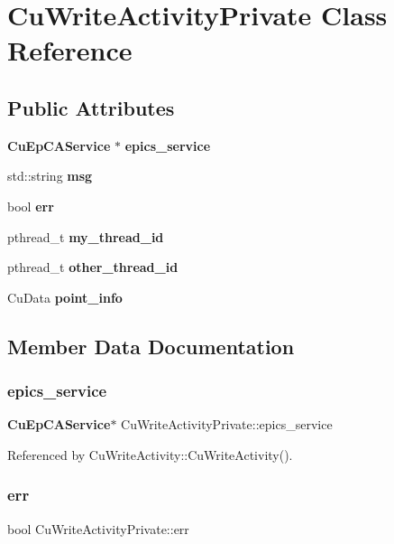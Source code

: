 \section{Cu\+Write\+Activity\+Private Class Reference}
\label{classCuWriteActivityPrivate}
\subsection*{Public Attributes}
\begin{DoxyCompactItemize}
\item 
\textbf{ Cu\+Ep\+C\+A\+Service} $\ast$ \textbf{ epics\+\_\+service}
\item 
std\+::string \textbf{ msg}
\item 
bool \textbf{ err}
\item 
pthread\+\_\+t \textbf{ my\+\_\+thread\+\_\+id}
\item 
pthread\+\_\+t \textbf{ other\+\_\+thread\+\_\+id}
\item 
Cu\+Data \textbf{ point\+\_\+info}
\end{DoxyCompactItemize}


\subsection{Member Data Documentation}
\mbox{\label{classCuWriteActivityPrivate_a53c62a50cd5c4bbae6ad887d01846831}} 
\subsubsection{epics\+\_\+service}
{\footnotesize\ttfamily \textbf{ Cu\+Ep\+C\+A\+Service}$\ast$ Cu\+Write\+Activity\+Private\+::epics\+\_\+service}



Referenced by Cu\+Write\+Activity\+::\+Cu\+Write\+Activity().

\mbox{\label{classCuWriteActivityPrivate_a885eca9c954ca5592b7d7cada294cd1e}} 
\subsubsection{err}
{\footnotesize\ttfamily bool Cu\+Write\+Activity\+Private\+::err}



